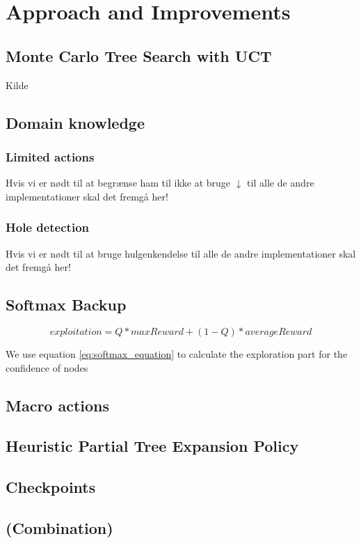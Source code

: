 \documentclass[10pt,a4paper]{article}
\begin{document}
\section{Approach and Improvements}

\subsection{Monte Carlo Tree Search with UCT}
Kilde \cite{mctssurvey}

\subsection{Domain knowledge}

\subsubsection{Limited actions}
Hvis vi er nødt til at begrænse ham til ikke at bruge $\downarrow$ til alle de andre implementationer skal det fremgå her!
\subsubsection{Hole detection}
Hvis vi er nødt til at bruge hulgenkendelse til alle de andre implementationer skal det fremgå her!

\subsection{Softmax Backup}
\begin{equation}\label{eq:softmax_equation}
exploitation = Q * maxReward + (1 - Q ) * averageReward
\end{equation}

We use equation \ref{eq:softmax_equation} to calculate the exploration part for the confidence of nodes
\subsection{Macro actions}
\cite{salesman}
\subsection{Heuristic Partial Tree Expansion Policy}
\subsection{Checkpoints}

\subsection{(Combination)}
\end{document}
